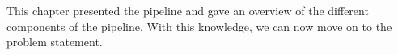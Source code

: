 


This chapter presented the pipeline and gave an overview of the different components of the pipeline. With this knowledge, we can now move on to the problem statement.










